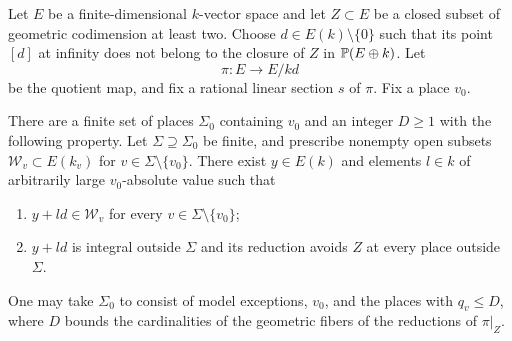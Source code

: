 \begin{lemma}\label{approx:line-sieve}
Let $E$ be a finite-dimensional $k$-vector space and let $Z\subset E$
be a closed subset of geometric codimension at least two.  Choose
$d\in E(k)\setminus\{0\}$ such that its point $[d]$ at infinity
does not belong to the closure of $Z$ in $\mathbb P(E\oplus k)$.
Let
\[
 \pi:E\longrightarrow E/kd
\]
be the quotient map, and fix a rational linear section $s$ of $\pi$.
Fix a place $v_0$.

There are a finite set of places $\Sigma_0$ containing $v_0$ and an
integer $D\geq1$ with the following property.  Let $\Sigma\supseteq
\Sigma_0$ be finite, and prescribe nonempty open subsets
$\mathcal W_v\subset E(k_v)$ for $v\in\Sigma\setminus\{v_0\}$.
There exist $y\in E(k)$ and elements $l\in k$ of arbitrarily
large $v_0$-absolute value such that
\begin{enumerate}
\item $y+ld\in\mathcal W_v$ for every
      $v\in\Sigma\setminus\{v_0\}$;
\item $y+ld$ is integral outside $\Sigma$ and its reduction avoids
      $Z$ at every place outside $\Sigma$.
\end{enumerate}
One may take $\Sigma_0$ to consist of model exceptions, $v_0$, and
the places with $q_v\leq D$, where $D$ bounds the cardinalities of
the geometric fibers of the reductions of $\pi|_Z$.
\end{lemma}

